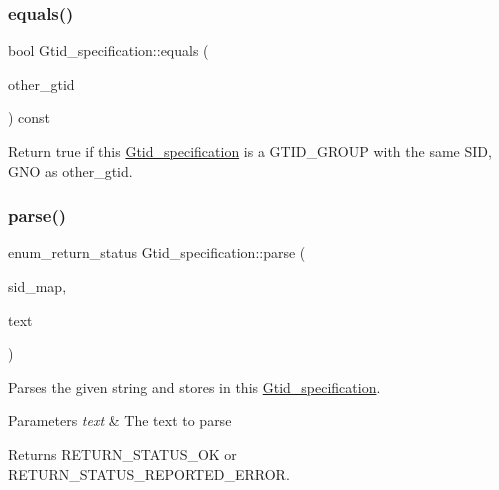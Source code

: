\subsubsection{\texorpdfstring{equals()}{equals()}}
{\footnotesize\ttfamily bool Gtid\+\_\+specification\+::equals (\begin{DoxyParamCaption}\item[{const \mbox{\hyperlink{structGtid}{Gtid}} \&}]{other\+\_\+gtid }\end{DoxyParamCaption}) const\hspace{0.3cm}{\ttfamily [inline]}}

Return true if this \mbox{\hyperlink{structGtid__specification}{Gtid\+\_\+specification}} is a G\+T\+I\+D\+\_\+\+G\+R\+O\+UP with the same S\+ID, G\+NO as \textquotesingle{}other\+\_\+gtid\textquotesingle{}. \mbox{\label{structGtid__specification_aac8ea9239e9e8a92f6970a172c58f5c0}} 
\subsubsection{\texorpdfstring{parse()}{parse()}}
{\footnotesize\ttfamily enum\+\_\+return\+\_\+status Gtid\+\_\+specification\+::parse (\begin{DoxyParamCaption}\item[{\mbox{\hyperlink{classSid__map}{Sid\+\_\+map}} $\ast$}]{sid\+\_\+map,  }\item[{const char $\ast$}]{text }\end{DoxyParamCaption})}

Parses the given string and stores in this \mbox{\hyperlink{structGtid__specification}{Gtid\+\_\+specification}}.


\begin{DoxyParams}{Parameters}
{\em text} & The text to parse \\
\hline
\end{DoxyParams}
\begin{DoxyReturn}{Returns}
R\+E\+T\+U\+R\+N\+\_\+\+S\+T\+A\+T\+U\+S\+\_\+\+OK or R\+E\+T\+U\+R\+N\+\_\+\+S\+T\+A\+T\+U\+S\+\_\+\+R\+E\+P\+O\+R\+T\+E\+D\+\_\+\+E\+R\+R\+OR. 
\end{DoxyReturn}
\mbox{\label{structGtid__specification_a9bad0bb6fe5496f470066cac0cf85d70}} 
